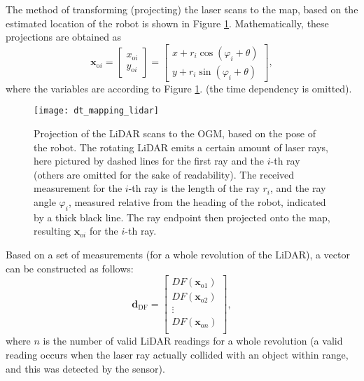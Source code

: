 The method of transforming (projecting) the laser scans to the map, based on the estimated
location of the robot is shown in Figure \ref{fig:ogm-laser-projection}.
Mathematically, these projections are obtained as
\begin{equation}\label{eq:ray-projection}
    \mathbf{x}_{\mathrm{o}i} = \begin{bmatrix}x_{\mathrm{o}i}\\y_{\mathrm{o}i}\end{bmatrix}
    = \begin{bmatrix}x + r_i\cos(\varphi_i + \theta)\\y + r_i\sin(\varphi_i + \theta)\end{bmatrix},
\end{equation}
where the variables are according to Figure \ref{fig:ogm-laser-projection}. (the time dependency is omitted).
\begin{figure}[htbp]
    \centering
    \texttt{[image: dt\_mapping\_lidar]}
    \caption{Projection of the LiDAR scans to the OGM, based on the pose of the robot.
    The rotating LiDAR emits a certain amount of laser rays,
    here pictured by dashed lines for the first ray and the $i$-th ray
    (others are omitted for the sake of readability).
    The received measurement for the $i$-th ray is the length of the ray $r_i$,
    and the ray angle $\varphi_i$, measured relative from the heading of the robot,
    indicated by a thick black line.
    The ray endpoint then projected onto the map, resulting $\mathbf{x}_{\text{o}i}$ for the $i$-th ray.}
    \label{fig:ogm-laser-projection}
\end{figure}

Based on a set of measurements (for a whole revolution of the LiDAR), a vector can be constructed as follows:
\begin{equation}\label{eq:df-vector}
    \mathbf{d}_{\text{DF}} =
    \begin{bmatrix}
        DF(\mathbf{x}_{\text{o}1}) \\
        DF(\mathbf{x}_{\text{o}2}) \\
        \vdots                     \\
        DF(\mathbf{x}_{\text{o}n}) \\
    \end{bmatrix},
\end{equation}
where $n$ is the number of valid LiDAR readings for a whole revolution
(a valid reading occurs when the laser ray actually collided with an object within range, and this was
detected by the sensor).

